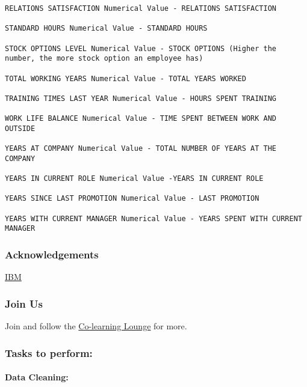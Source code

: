 \documentclass[11pt]{article}
\begin{document}
\begin{verbatim}
RELATIONS SATISFACTION Numerical Value - RELATIONS SATISFACTION

STANDARD HOURS Numerical Value - STANDARD HOURS

STOCK OPTIONS LEVEL Numerical Value - STOCK OPTIONS (Higher the number, the more stock option an employee has)

TOTAL WORKING YEARS Numerical Value - TOTAL YEARS WORKED

TRAINING TIMES LAST YEAR Numerical Value - HOURS SPENT TRAINING

WORK LIFE BALANCE Numerical Value - TIME SPENT BETWEEN WORK AND OUTSIDE

YEARS AT COMPANY Numerical Value - TOTAL NUMBER OF YEARS AT THE COMPANY

YEARS IN CURRENT ROLE Numerical Value -YEARS IN CURRENT ROLE

YEARS SINCE LAST PROMOTION Numerical Value - LAST PROMOTION

YEARS WITH CURRENT MANAGER Numerical Value - YEARS SPENT WITH CURRENT MANAGER
\end{verbatim}

\hypertarget{acknowledgements}{%
\subsubsection{Acknowledgements}\label{acknowledgements}}

\href{https://www.ibm.com/communities/analytics/watson-analytics-blog/watson-analytics-use-case-for-hr-retaining-valuable-employees/}{IBM}

\hypertarget{join-us}{%
\subsubsection{Join Us}\label{join-us}}

Join and follow the
\href{https://linktr.ee/colearninglounge}{Co-learning Lounge} for more.

    \hypertarget{tasks-to-perform}{%
\subsubsection{\texorpdfstring{\textbf{Tasks to perform:
}}{Tasks to perform: }}\label{tasks-to-perform}}

\hypertarget{data-cleaning}{%
\paragraph{Data Cleaning:}\label{data-cleaning}}
\end{document}
